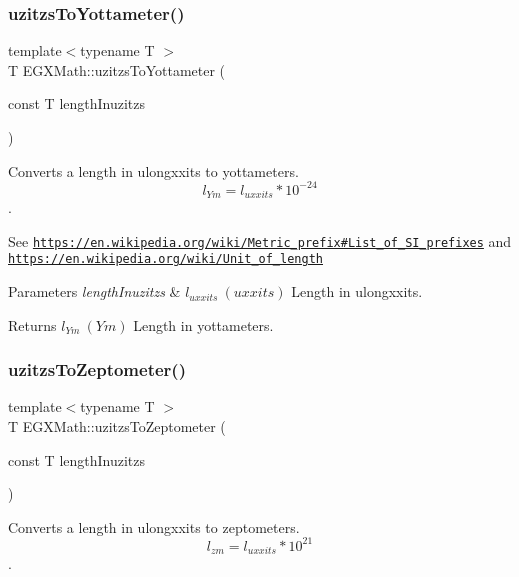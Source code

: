 \subsubsection{\texorpdfstring{uzitzs\+To\+Yottameter()}{uzitzsToYottameter()}}
{\footnotesize\ttfamily template$<$typename T $>$ \\
T E\+G\+X\+Math\+::uzitzs\+To\+Yottameter (\begin{DoxyParamCaption}\item[{const T}]{length\+Inuzitzs }\end{DoxyParamCaption})}



Converts a length in ulongxxits to yottameters. \[ l_{Ym}=l_{uxxits} * 10^{-24} \]. 

See \href{https://en.wikipedia.org/wiki/Metric_prefix#List_of_SI_prefixes}{\tt https\+://en.\+wikipedia.\+org/wiki/\+Metric\+\_\+prefix\#\+List\+\_\+of\+\_\+\+S\+I\+\_\+prefixes} and \href{https://en.wikipedia.org/wiki/Unit_of_length}{\tt https\+://en.\+wikipedia.\+org/wiki/\+Unit\+\_\+of\+\_\+length} 
\begin{DoxyParams}{Parameters}
{\em length\+Inuzitzs} & $ l_{uxxits}\ (uxxits)$ Length in ulongxxits. \\
\hline
\end{DoxyParams}
\begin{DoxyReturn}{Returns}
$ l_{Ym}\ (Ym)$ Length in yottameters. 
\end{DoxyReturn}
\mbox{\label{group___e_g_x_math-_conversions-_length_conversions-uzitzs-_s_i_ga9057f57c3f49216e6272c6f0f29ded62}} 
\subsubsection{\texorpdfstring{uzitzs\+To\+Zeptometer()}{uzitzsToZeptometer()}}
{\footnotesize\ttfamily template$<$typename T $>$ \\
T E\+G\+X\+Math\+::uzitzs\+To\+Zeptometer (\begin{DoxyParamCaption}\item[{const T}]{length\+Inuzitzs }\end{DoxyParamCaption})}



Converts a length in ulongxxits to zeptometers. \[ l_{zm}=l_{uxxits} * 10^{21} \]. 

